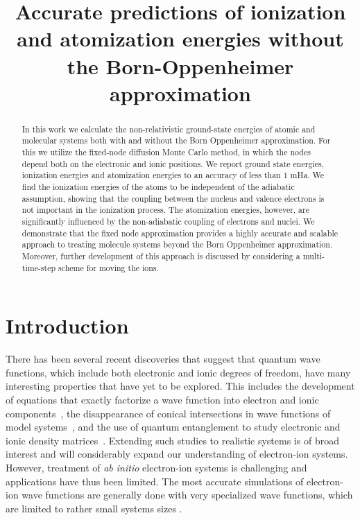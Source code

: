 \documentclass[pra,superscriptaddress,groupedaddress,twocolumn]{revtex4}
\begin{document}
\title{Accurate predictions of ionization and atomization energies without the Born-Oppenheimer approximation}

\begin{abstract}
In this work we calculate the non-relativistic ground-state energies of atomic and molecular systems both with and without the Born Oppenheimer approximation. For this we utilize the fixed-node diffusion Monte Carlo method, in which the nodes depend both on the electronic and ionic positions. We report ground state energies, ionization energies and atomization energies to an accuracy of less than $1$ mHa. We find the ionization energies of the atoms to be independent of the adiabatic assumption, showing that the coupling between the nucleus and valence electrons is not important in the ionization process. The atomization energies, however, are significantly influenced by the non-adiabatic coupling of electrons and nuclei. We demonstrate that the fixed node approximation provides a highly accurate and scalable approach to treating molecule systems beyond the Born Oppenheimer approximation. Moreover, further development of this approach is discussed by considering a multi-time-step scheme for moving the ions. 
\end{abstract}
\maketitle

\section{Introduction}
There has been several recent discoveries that suggest that quantum wave functions, which include both electronic and ionic degrees of freedom, have many interesting properties that have yet to be explored.  This includes the development of equations that exactly factorize a wave function into electron and ionic components~\cite{cederbaum1}, the disappearance of conical intersections in wave functions of model systems~\cite{gross2014}, and the use of quantum entanglement to study electronic and ionic density matrices~\cite{boent}.  Extending such studies to realistic systems is of broad interest and will considerably expand our understanding of electron-ion systems.   However, treatment of \textit{ab initio} electron-ion systems is challenging and applications have thus been limited.   The most accurate simulations of electron-ion wave functions are generally done with very specialized wave functions, which are limited to rather small systems sizes \cite{mitroy2013}.  
\end{document}
